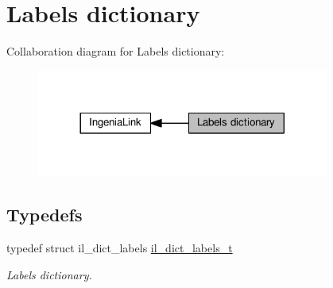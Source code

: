 \hypertarget{group__IL__DICT__LABELS}{}\section{Labels dictionary}
\label{group__IL__DICT__LABELS}
Collaboration diagram for Labels dictionary\+:\nopagebreak
\begin{figure}[H]
\begin{center}
\leavevmode
\includegraphics[width=272pt]{group__IL__DICT__LABELS}
\end{center}
\end{figure}
\subsection*{Typedefs}
\begin{DoxyCompactItemize}
\item 
typedef struct il\+\_\+dict\+\_\+labels \hyperlink{group__IL__DICT__LABELS_ga69d1109256f465cbcfa8aac7fa592495}{il\+\_\+dict\+\_\+labels\+\_\+t}
\begin{DoxyCompactList}\small\item\em Labels dictionary. \end{DoxyCompactList}\end{DoxyCompactItemize}
